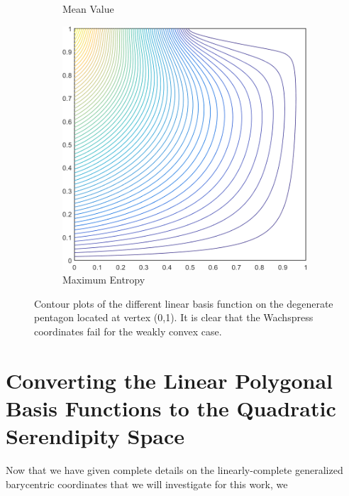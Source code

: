 \begin{figure}
{\begin{subfigure}[b]{0.39\textwidth}
		\caption{Mean Value}
	\end{subfigure}
	\hspace{1.5cm}
	\begin{subfigure}[b]{0.39\textwidth}
		\centering
		\includegraphics[width=\textwidth]{figures/sec_BF/deg_square_MAXENT1_contour_b5.png}
		\caption{Maximum Entropy}
	\end{subfigure}
}
\caption[Contour plots of the linear basis functions on the degenerate pentagon.]{Contour plots of the different linear basis function on the degenerate pentagon located at vertex (0,1). It is clear that the Wachspress coordinates fail for the weakly convex case.}
\end{figure}

\section{Converting the Linear Polygonal Basis Functions to the Quadratic Serendipity Space}
\label{sec::BF_2DQuadratic}

Now that we have given complete details on the linearly-complete generalized barycentric coordinates that we will investigate for this work, we 

